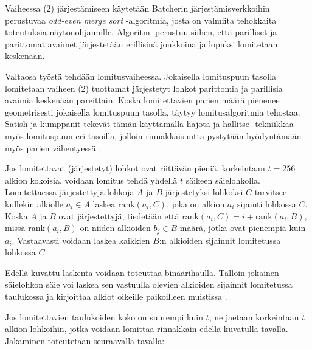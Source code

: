 \documentclass[a4paper,11pt]{article}
\newcommand{\engl}[1]{\foreignlanguage{english}{\em #1}}
\begin{document}
Vaiheessa (2) järjestämiseen käytetään Batcherin järjestämisverkkoihin perustuvaa \engl{odd-even merge sort} -algoritmia, josta on valmiita tehokkaita toteutuksia näytönohjaimille. Algoritmi perustuu siihen, että parilliset ja parittomat avaimet järjestetään erillisinä joukkoina ja lopuksi lomitetaan keskenään.

Valtaosa työstä tehdään lomitusvaiheessa. Jokaisella lomituspuun tasolla lomitetaan vaiheen (2) tuottamat järjestetyt lohkot parittomia ja parillisia avaimia keskenään pareittain. Koska lomitettavien parien määrä pienenee geometrisesti jokaisella lomituspuun tasolla, täytyy lomitusalgoritmia tehostaa. Satish ja kumppanit tekevät tämän käyttämällä hajota ja hallitse -tekniikkaa myös lomituspuun eri tasoilla, jolloin rinnakkaisuutta pystytään hyödyntämään myös parien vähentyessä \cite{satish2009}.

Jos lomitettavat (järjestetyt) lohkot ovat riittävän pieniä, korkeintaan $t = 256$ alkion kokoisia, voidaan lomitus tehdä yhdellä $t$ säikeen säielohkolla. Lomitettaessa järjestettyjä lohkoja $A$ ja $B$ järjestetyksi lohkoksi $C$ tarvitsee kullekin alkiolle $a_i \in A$ laskea $\mathrm{rank}(a_i, C)$, joka on alkion $a_i$ sijainti lohkossa $C$. Koska $A$ ja $B$ ovat järjestettyjä, tiedetään että $\mathrm{rank}(a_i, C) = i + \mathrm{rank}(a_i, B)$, missä $\mathrm{rank}(a_i, B)$ on niiden alkioiden $b_j \in B$ määrä, jotka ovat pienempiä kuin $a_i$. Vastaavasti voidaan laskea kaikkien $B$:n alkioiden sijainnit lomitetussa lohkossa $C$.

Edellä kuvattu laskenta voidaan toteuttaa binäärihaulla. Tällöin jokainen säielohkon säie voi laskea sen vastuulla olevien alkioiden sijainnit lomitetussa taulukossa ja kirjoittaa alkiot oikeille paikoilleen muistissa \cite{satish2009}.

Jos lomitettavien taulukoiden koko on suurempi kuin $t$, ne jaetaan korkeintaan $t$ alkion lohkoihin, jotka voidaan lomittaa rinnakkain edellä kuvatulla tavalla. Jakaminen toteutetaan seuraavalla tavalla:
\end{document}
